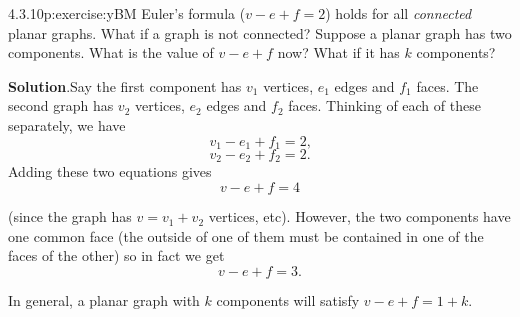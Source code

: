 \documentclass[twoside,11pt,]{book}
\newcommand{\blocktitlefont}{\relax}
\numberwithin{equation}{chapter}
\begin{document}
\begin{divisionsolution}{4.3.10}{}{p:exercise:yBM}%
Euler's formula (\(v - e + f = 2\)) holds for all \emph{connected} planar graphs. What if a graph is not connected? Suppose a planar graph has two components. What is the value of \(v - e + f\) now? What if it has \(k\) components?%
\par\smallskip%
\noindent\textbf{\blocktitlefont Solution}.\quad{}Say the first component has \(v_1\) vertices, \(e_1\) edges and \(f_1\) faces. The second graph has \(v_2\) vertices, \(e_2\) edges and \(f_2\) faces. Thinking of each of these separately, we have%
\begin{equation*}
v_1 - e_1 + f_1 = 2\text{,}
\end{equation*}
%
%
\begin{equation*}
v_2 - e_2 + f_2 = 2\text{.}
\end{equation*}
Adding these two equations gives%
\begin{equation*}
v - e + f = 4
\end{equation*}
%
\par
(since the graph has \(v = v_1 + v_2\) vertices, etc). However, the two components have one common face (the outside of one of them must be contained in one of the faces of the other) so in fact we get%
\begin{equation*}
v - e + f = 3\text{.}
\end{equation*}
%
\par
In general, a planar graph with \(k\) components will satisfy \(v - e + f = 1 + k\).%
\end{divisionsolution}%
\end{document}
